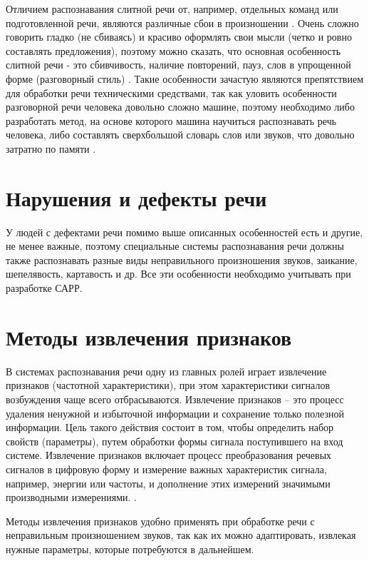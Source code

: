 Отличием распознавания слитной речи от, например, отдельных команд или подготовленной речи, являются различные сбои в произношении \cite{rechsb2} \cite{rechsb1}. Очень сложно говорить гладко (не сбиваясь) и красиво оформлять свои мысли (четко и ровно составлять предложения), поэтому можно сказать, что основная особенность слитной речи - это сбивчивость, наличие повторений, пауз, слов в упрощенной форме (разговорный стиль) \cite{slitrech}. Такие особенности зачастую являются препятствием для обработки речи техническими средствами, так как уловить особенности разговорной речи человека довольно сложно машине, поэтому необходимо либо разработать метод, на основе которого машина научиться распознавать речь человека, либо составлять сверхбольшой словарь слов или звуков, что довольно затратно по памяти \cite{slitrech}.


\section{Нарушения и дефекты речи}
У людей с дефектами речи помимо выше описанных особенностей есть и другие, не менее важные, поэтому специальные системы распознавания речи должны также распознавать разные виды неправильного произношения звуков, заикание, шепелявость, картавость и др. Все эти особенности необходимо учитывать при разработке САРР. 



\section{Методы извлечения признаков}
В системах распознавания речи одну из главных ролей играет извлечение признаков (частотной характеристики), при этом характеристики сигналов возбуждения чаще всего отбрасываются. Извлечение признаков -- это процесс удаления ненужной и избыточной информации и сохранение только полезной информации. Цель такого действия состоит в том, чтобы определить набор свойств (параметры), путем обработки формы сигнала поступившего на вход системе.  Извлечение признаков включает процесс преобразования речевых сигналов в цифровую форму и измерение важных характеристик сигнала, например, энергии или частоты, и дополнение этих измерений значимыми производными измерениями. \cite{isvparam1} \cite{isvparam2}.

Методы извлечения признаков удобно применять при обработке речи с неправильным произношением звуков, так как их можно адаптировать, извлекая нужные параметры, которые потребуются в дальнейшем.

